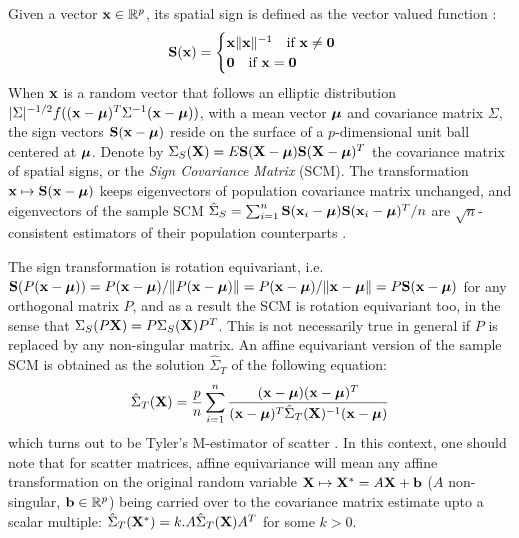 \documentclass[10pt]{book}
\begin{document}
\vspace{1em}
\setcounter{chapter}{2}
\setcounter{equation}{0} %

Given a vector ${\bf{x}} \in \mathbb{R}^p$, its spatial sign is defined as the vector valued function \citep{locantore99}:
%
$$ {\mathbf{S}}({\bf{x}}) = \begin{cases} {\bf{x}}\| {\bf{x}} \|^{-1} \quad \mbox{if }{\bf{x}} \neq \bf0\\
\bf0 \quad \mbox{if }{\bf{x}} = \bf0 \end{cases} $$
%
When ${\bf{x}}$ is a random vector that follows an elliptic distribution $|\Sigma|^{-1/2} f(({\bf{x}} - {\boldsymbol{\mu}})^T \Sigma^{-1} ({\bf{x}} - {\boldsymbol{\mu}}))$, with a mean vector ${\boldsymbol{\mu}}$ and covariance matrix $\Sigma$, the sign vectors ${\mathbf{S}}({\bf{x}} - {\boldsymbol{\mu}})$ reside on the surface of a $p$-dimensional unit ball centered at ${\boldsymbol{\mu}}$. Denote by $\Sigma_S({\mathbf{X}}) = E{\mathbf{S}} ({\mathbf{X}} - {\boldsymbol{\mu}}){\mathbf{S}} ({\mathbf{X}} - {\boldsymbol{\mu}})^T$ the covariance matrix of spatial signs, or the \textit{Sign Covariance Matrix} (SCM). The transformation ${\bf{x}} \mapsto {\mathbf{S}}({\bf{x}} - {\boldsymbol{\mu}})$ keeps eigenvectors of population covariance matrix unchanged, and eigenvectors of the sample SCM $ \hat \Sigma_S = \sum_{i=1}^n {\mathbf{S}} ({\bf{x}}_i - {\boldsymbol{\mu}}){\mathbf{S}} ({\bf{x}}_i - {\boldsymbol{\mu}})^T/n $ are $\sqrt n$-consistent estimators of their population counterparts \citep{taskinen12}.

The sign transformation is rotation equivariant, i.e. $ {\mathbf{S}}(P ({\bf{x}} - {\boldsymbol{\mu}})) = P({\bf{x}} - {\boldsymbol{\mu}})/\| P ({\bf{x}} - {\boldsymbol{\mu}})\| = P({\bf{x}} - {\boldsymbol{\mu}})/\|{\bf{x}} - {\boldsymbol{\mu}}\| = P {\mathbf{S}}({\bf{x}} - {\boldsymbol{\mu}})$ for any orthogonal matrix $P$, and as a result the SCM is rotation equivariant too, in the sense that $\Sigma_S(P{\mathbf{X}}) = P \Sigma_S({\mathbf{X}}) P^T$. This is not necessarily true in general if $P$ is replaced by any non-singular matrix. An affine equivariant version of the sample SCM is obtained as the solution $\hat \Sigma_T$ of the following equation:
%
$$ \hat \Sigma_T({\mathbf{X}}) = \frac{p}{n} \sum_{i=1}^n \frac{({\bf{x}} - {\boldsymbol{\mu}})({\bf{x}} - {\boldsymbol{\mu}})^T}{({\bf{x}} - {\boldsymbol{\mu}})^T \hat\Sigma_T({\mathbf{X}})^{-1} ({\bf{x}} - {\boldsymbol{\mu}})} $$
%
which turns out to be Tyler's M-estimator of scatter \citep{tyler87}. In this context, one should note that for scatter matrices, affine equivariance will mean any affine transformation on the original random variable ${\mathbf{X}} \mapsto {\mathbf{X}}^* = A{\mathbf{X}} + {\bf{b}}$ ($A$ non-singular, ${\bf{b}} \in \mathbb{R}^p$) being carried over to the covariance matrix estimate upto a scalar multiple: $\hat\Sigma_T({\mathbf{X}}^*) = k. A \hat\Sigma_T({\mathbf{X}}) A^T$ for some $k>0$.

\vspace{.5em}
\end{document}

